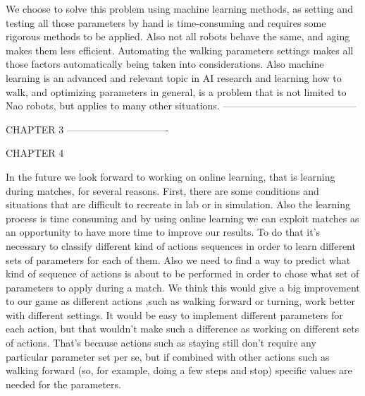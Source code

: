 We choose to solve this problem using machine learning methods, as setting and testing all those parameters by hand is time-consuming and requires some rigorous methods to be applied. Also not all robots behave the same, and aging makes them less efficient. Automating the walking parameters settings makes all those factors automatically being taken into considerations. Also machine learning is an advanced and relevant topic in AI research and learning how to walk, and optimizing parameters in general, is a problem that is not limited to Nao robots, but applies to many other situations. -----------------------------------------


CHAPTER 3 -------------------------------



CHAPTER 4
 
In the future we look forward to working on online learning, that is learning during matches, for several reasons. First, there are some conditions and situations that are difficult to recreate in lab or in simulation. Also the learning process is time consuming and by using online learning we can exploit matches as an opportunity to have more time to improve our results. To do that it's necessary to classify different kind of actions sequences in order to learn different sets of parameters for each of them. Also we need to find a way to predict what kind of sequence of actions is about to be performed in order to chose what set of parameters to apply during a match. We think this would give a big improvement to our game as different actions ,such as walking forward or turning, work better with different settings. It would be easy to implement different parameters for each action, but that wouldn't make such a difference as working on different sets of actions. That's because actions such as staying still don't require any particular parameter set per se, but if combined with other actions such as walking forward (so, for example, doing a few steps and stop) specific values are needed for the parameters. 
